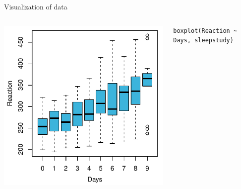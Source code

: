 \documentclass[aspectratio=169]{beamer}
\begin{document}
\begin{frame}[fragile]{Visualization of data}
  \begin{columns}
    \begin{column}{.53\textwidth}
      \includegraphics[scale=.8]{../figures/sleep_box}
    \end{column}
    \begin{column}{.55\textwidth}
\begin{lstlisting}
boxplot(Reaction ~ Days, sleepstudy)
\end{lstlisting}
    \end{column}
  \end{columns}
\end{frame}
\end{document}

